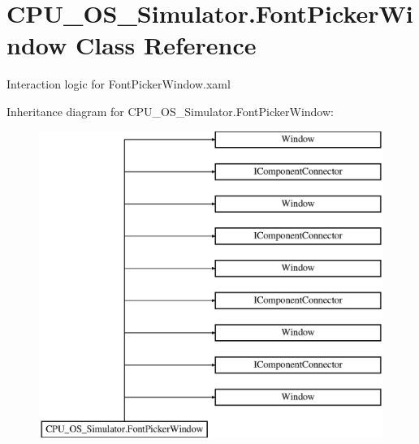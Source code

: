 \hypertarget{class_c_p_u___o_s___simulator_1_1_font_picker_window}{}\section{C\+P\+U\+\_\+\+O\+S\+\_\+\+Simulator.\+Font\+Picker\+Window Class Reference}
\label{class_c_p_u___o_s___simulator_1_1_font_picker_window}


Interaction logic for Font\+Picker\+Window.\+xaml  


Inheritance diagram for C\+P\+U\+\_\+\+O\+S\+\_\+\+Simulator.\+Font\+Picker\+Window\+:\begin{figure}[H]
\begin{center}
\leavevmode
\includegraphics[height=10.000000cm]{class_c_p_u___o_s___simulator_1_1_font_picker_window}
\end{center}
\end{figure}
